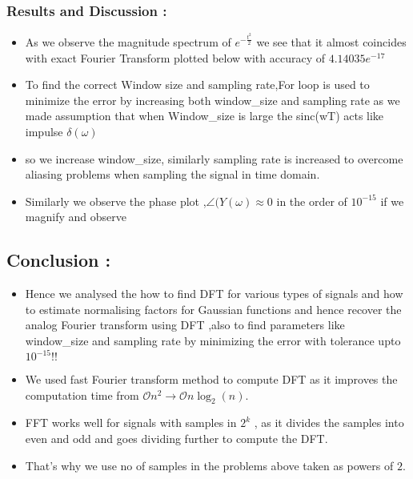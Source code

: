 \documentclass[11pt]{article}
\providecommand{\tightlist}{%
      \setlength{\itemsep}{0pt}\setlength{\parskip}{0pt}}
\begin{document}
    \begin{center}
    \end{center}
    { \hspace*{\fill} \\}
    
	
		
    \subsubsection{Results and Discussion :}\label{results-and-discussion}

\begin{itemize}
\tightlist
\item
  As we observe the magnitude spectrum of \(e^{-\frac{t^{2}}{ 2}}\) we
  see that it almost coincides with exact Fourier Transform plotted
  below with accuracy of \(4.14035e^{-17}\)
\item
  To find the correct Window size and sampling rate,For loop is used to
  minimize the error by increasing both window\_size and sampling rate
  as we made assumption that when Window\_size is large the sinc(wT)
  acts like impulse \(\delta(\omega)\)
\item
  so we increase window\_size, similarly sampling rate is increased to
  overcome aliasing problems when sampling the signal in time domain.
\item
  Similarly we observe the phase plot ,\(\angle(Y(\omega) \approx 0\) in
  the order of \(10^{-15}\) if we magnify and observe
\end{itemize}

	

	
		
    \subsection{Conclusion :}\label{conclusion}

\begin{itemize}
\tightlist
\item
  Hence we analysed the how to find DFT for various types of signals and
  how to estimate normalising factors for Gaussian functions and hence
  recover the analog Fourier transform using DFT ,also to find
  parameters like window\_size and sampling rate by minimizing the error
  with tolerance upto \(10^{-15}!!\)
\item
  We used fast Fourier transform method to compute DFT as it improves
  the computation time from
  \(\mathcal{O} n^2 \to \mathcal{O} n\log_2(n)\).
\item
  FFT works well for signals with samples in \(2^{k}\) , as it divides
  the samples into even and odd and goes dividing further to compute the
  DFT.
\item
  That's why we use no of samples in the problems above taken as powers
  of \(2\).
\end{itemize}

	


    
    
    
    
\end{document}
